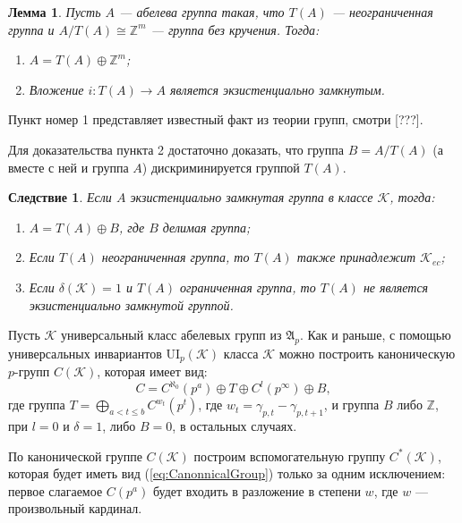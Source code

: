\documentclass[14pt]{extarticle} %
\newtheorem{lemma}{Лемма}[section]
\newtheorem{corollary}{Следствие}[section]
\def\proof{{\noindent{\bf Доказательство.}} }
\def\A{{\mathfrak{A}}}
\def\K{{\mathcal{K}}}
\def\Z{{\mathbb{Z}}}
\def\ui{{\mathrm{UI}}}
\begin{document}
\begin{lemma}
Пусть $A$ --- абелева группа такая, что $T(A)$ --- неограниченная группа и $A \big/ T(A) \cong \Z^m$ --- группа без кручения. Тогда:
\begin{enumerate}
\item $A = T(A) \oplus \Z^m$;
\item Вложение $i : T(A) \rightarrow A$ является экзистенциально замкнутым.
\end{enumerate}
\end{lemma}

\proof Пункт номер 1 представляет известный факт из теории групп, смотри [???]. 

Для доказательства пункта 2 достаточно доказать, что группа $B = A \big/ T(A)$ (а вместе с ней и группа $A$) дискриминируется группой $T(A)$.


\begin{corollary}
Если $A$ экзистенциально замкнутая группа в классе $\K$, тогда:
\begin{enumerate}
\item $A = T(A) \oplus B$, где $B$ делимая группа;
\item Если $T(A)$ неограниченная группа, то $T(A)$ также принадлежит $\K_{ec}$;
\item Если $\delta(\K) = 1$ и $T(A)$ ограниченная группа, то $T(A)$ не является экзистенциально замкнутой группой.
\end{enumerate}
\end{corollary}


Пусть $\K$ универсальный класс абелевых групп из $\A_p$. Как и раньше, с помощью универсальных инвариантов $\ui_p(\K)$ класса $\K$ можно построить каноническую $p$-групп $C(\K)$, которая имеет вид:
\begin{equation}\label{eq:CanonnicalGroup}
 C = C^{\aleph_0}(p^a) \oplus T \oplus C^l(p^\infty) \oplus B,
 \end{equation}
где группа $T = \bigoplus\limits_{ a < t \leq b} C^{w_t}(p^t)$, где $w_t = \gamma_{p,t} - \gamma_{p,t+1}$, и группа $B$ либо $\Z$, при $l = 0$ и $\delta = 1$, либо $B = 0$, в остальных случаях.

По канонической группе $C(\K)$ построим вспомогательную группу $C^*(\K)$, которая будет иметь вид (\ref{eq:CanonnicalGroup}) только за одним исключением: первое слагаемое $C(p^a)$ будет входить в разложение в степени $w$, где $w$ --- произвольный кардинал.
\end{document}
